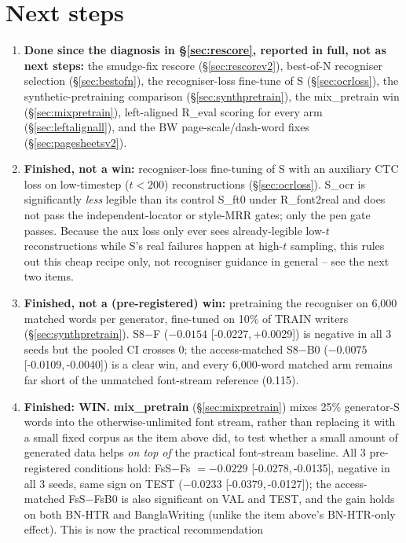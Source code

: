 \documentclass[10.5pt,a4paper]{article}
\newcommand{\ci}[2]{{\footnotesize[#1,\,#2]}}
\begin{document}
\section{Next steps}
\label{sec:next}
\begin{enumerate}
\item \textbf{Done since the diagnosis in \S\ref{sec:rescore}, reported in full, not as next steps:} the smudge-fix rescore
  (\S\ref{sec:rescorev2}), best-of-N recogniser selection (\S\ref{sec:bestofn}), the recogniser-loss fine-tune of S
  (\S\ref{sec:ocrloss}), the synthetic-pretraining comparison (\S\ref{sec:synthpretrain}), the mix\_pretrain win
  (\S\ref{sec:mixpretrain}), left-aligned R\_eval scoring for every arm (\S\ref{sec:leftalignall}), and the BW
  page-scale/dash-word fixes (\S\ref{sec:pagesheetsv2}).
\item \textbf{Finished, not a win:} recogniser-loss fine-tuning of S with an auxiliary CTC loss on low-timestep
  ($t<200$) reconstructions (\S\ref{sec:ocrloss}). S\_ocr is significantly \emph{less} legible than its control S\_ft0
  under R\_font2real and does not pass the independent-locator or style-MRR gates; only the pen gate passes. Because the
  aux loss only ever sees already-legible low-$t$ reconstructions while S's real failures happen at high-$t$ sampling, this
  rules out this cheap recipe only, not recogniser guidance in general -- see the next two items.
\item \textbf{Finished, not a (pre-registered) win:} pretraining the recogniser on 6,000 matched words per generator,
  fine-tuned on 10\% of TRAIN writers (\S\ref{sec:synthpretrain}). S8$-$F ($-0.0154$ \ci{-0.0227}{+0.0029}) is negative
  in all 3 seeds but the pooled CI crosses 0; the access-matched S8$-$B0 ($-0.0075$ \ci{-0.0109}{-0.0040}) is a clear win,
  and every 6,000-word matched arm remains far short of the unmatched font-stream reference (0.115).
\item \textbf{Finished: WIN.} \textbf{mix\_pretrain} (\S\ref{sec:mixpretrain}) mixes 25\% generator-S words into the
  otherwise-unlimited font stream, rather than replacing it with a small fixed corpus as the item above did, to test
  whether a small amount of generated data helps \emph{on top of} the practical font-stream baseline. All 3 pre-registered
  conditions hold: FsS$-$Fs $=-0.0229$ \ci{-0.0278}{-0.0135}, negative in all 3 seeds, same sign on TEST
  ($-0.0233$ \ci{-0.0379}{-0.0127}); the access-matched FsS$-$FsB0 is also significant on VAL and TEST, and the gain holds
  on both BN-HTR and BanglaWriting (unlike the item above's BN-HTR-only effect). This is now the practical recommendation

\end{enumerate}
\end{document}
